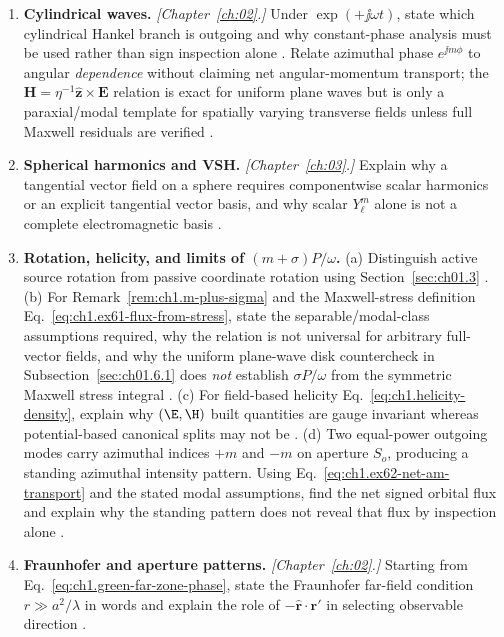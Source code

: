 \begin{enumerate}
\item \textbf{Cylindrical waves.}
\emph{[Chapter~\ref{ch:02}.]} Under $\exp(+\jj\omega t)$, state which cylindrical Hankel branch is outgoing and why constant-phase analysis must be used rather than sign inspection alone \cite{stratton1941,harrington2001}. Relate azimuthal phase $e^{\jj m\phi}$ to angular \emph{dependence} without claiming net angular-momentum transport; the $\mathbf{H}=\eta^{-1}\hat{\mathbf{z}}\times\mathbf{E}$ relation is exact for uniform plane waves but is only a paraxial/modal template for spatially varying transverse fields unless full Maxwell residuals are verified \cite{beth1936,allen1992}.

\item \textbf{Spherical harmonics and VSH.}
\emph{[Chapter~\ref{ch:03}.]} Explain why a tangential vector field on a sphere requires componentwise scalar harmonics or an explicit tangential vector basis, and why scalar $Y_\ell^m$ alone is not a complete electromagnetic basis \cite{stratton1941,hansen1988}.

\item \textbf{Rotation, helicity, and limits of $(m+\sigma)P/\omega$.}
(a) Distinguish active source rotation from passive coordinate rotation using Section~\ref{sec:ch01.3} \cite{beth1936,stratton1941}.
(b) For Remark~\ref{rem:ch1.m-plus-sigma} and the Maxwell-stress definition Eq.~\eqref{eq:ch1.ex61-flux-from-stress}, state the separable/modal-class assumptions required, why the relation is not universal for arbitrary full-vector fields, and why the uniform plane-wave disk countercheck in Subsection~\ref{sec:ch01.6.1} does \emph{not} establish $\sigma P/\omega$ from the symmetric Maxwell stress integral \cite{stratton1941,allen1992}.
(c) For field-based helicity Eq.~\eqref{eq:ch1.helicity-density}, explain why $(\E,\H)$ built quantities are gauge invariant whereas potential-based canonical splits may not be \cite{jackson1999,belinfante1940}.
(d) Two equal-power outgoing modes carry azimuthal indices $+m$ and $-m$ on aperture $S_o$, producing a standing azimuthal intensity pattern. Using Eq.~\eqref{eq:ch1.ex62-net-am-transport} and the stated modal assumptions, find the net signed orbital flux and explain why the standing pattern does not reveal that flux by inspection alone \cite{allen1992,beth1936}.

\item \textbf{Fraunhofer and aperture patterns.}
\emph{[Chapter~\ref{ch:02}.]} Starting from Eq.~\eqref{eq:ch1.green-far-zone-phase}, state the Fraunhofer far-field condition $r\gg a^2/\lambda$ in words and explain the role of $-\hat{\mathbf{r}}\cdot\mathbf{r}'$ in selecting observable direction \cite{bornwolf1999,silver1949}.


\end{enumerate}
